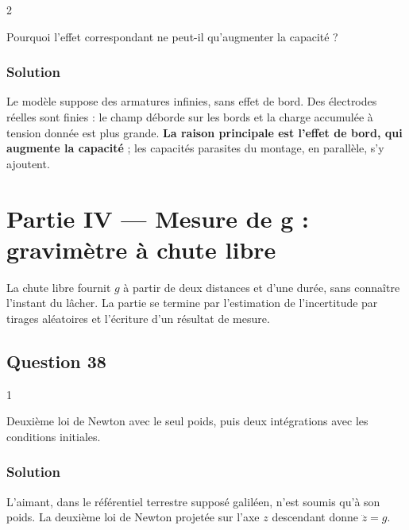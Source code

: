 \documentclass[11pt,a4paper]{article}
\begin{document}
\begin{indication}{2}

Pourquoi l'effet correspondant ne peut-il qu'augmenter la capacité ?

\end{indication}

\hypertarget{solution-36}{%
\subsubsection{Solution}\label{solution-36}}

Le modèle suppose des armatures infinies, sans effet de bord. Des électrodes réelles sont finies : le champ déborde sur les bords et la charge accumulée à tension donnée est plus grande. \textbf{La raison principale est l'effet de bord, qui augmente la capacité} ; les capacités parasites du montage, en parallèle, s'y ajoutent.

\hypertarget{partie-iv-mesure-de-g-gravimuxe8tre-uxe0-chute-libre}{%
\section{Partie IV --- Mesure de g : gravimètre à chute libre}\label{partie-iv-mesure-de-g-gravimuxe8tre-uxe0-chute-libre}}

La chute libre fournit \(g\) à partir de deux distances et d'une durée, sans connaître l'instant du lâcher. La partie se termine par l'estimation de l'incertitude par tirages aléatoires et l'écriture d'un résultat de mesure.

\hypertarget{question-38}{%
\subsection{Question 38}\label{question-38}}

\begin{indication}{1}

Deuxième loi de Newton avec le seul poids, puis deux intégrations avec les conditions initiales.

\end{indication}

\hypertarget{solution-37}{%
\subsubsection{Solution}\label{solution-37}}

L'aimant, dans le référentiel terrestre supposé galiléen, n'est soumis qu'à son poids. La deuxième loi de Newton projetée sur l'axe \(z\) descendant donne \(\ddot z=g\).
\end{document}
